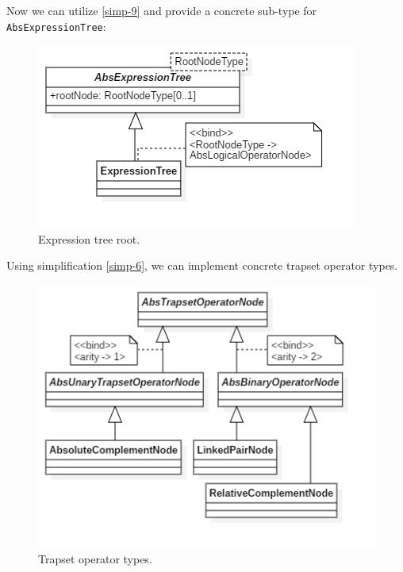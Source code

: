 \documentclass[12pt,oneside,a4paper,notitlepage]{report}
\begin{document}
	\newpage

	\par Now we can utilize \ref{simp-9} and provide a concrete sub-type for \texttt{AbsExpressionTree}:

	\begin{figure}[h]
		\begin{center}
			\includegraphics{Models/ExpressionTreeModelFragment}
		\end{center}
		\caption{Expression tree root.}
		\label{fig:expression-tree-model-fragment}
	\end{figure}

	\newpage

	\par Using simplification \ref{simp-6}, we can implement concrete trapset operator types.

	\begin{figure}[h]
		\begin{center}
			\includegraphics{Models/TrapsetOperatorType}
		\end{center}
		\caption{Trapset operator types.}
		\label{fig:trapset-operator-types}
	\end{figure}
\end{document}
